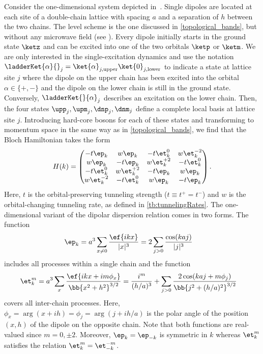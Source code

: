 Consider the one-dimensional system depicted in~.
Single dipoles are located at each site of a double-chain lattice with spacing $a$ and a separation of $h$ between the two chains.
The level scheme is the one discussed in \cref{topological_bands}, but without any microwave field (see ). Every dipole initially starts in the ground state $\ketz$ and can be excited into one of the two orbitals $\ketp$ or $\ketm$.
We are only interested in the single-excitation dynamics and use the notation $\ladderKet{\alpha}{}_j = \ket{\alpha}_{j,\text{upper}} \ket{0}_{j,\text{lower}}$ to indicate a state at lattice site $j$ where the dipole on the upper chain has been excited into the orbital $\alpha \in \{+, -\}$ and the dipole on the lower chain is still in the ground state.
Conversely, $\ladderKet{}{\alpha}_j$ describes an excitation on the lower chain.
Then, the four states $\upp_j, \upm_j, \dnp_j, \dnm_j$ define a complete local basis at lattice site $j$.
Introducing hard-core bosons for each of these states and transforming to momentum space in the same way as in \cref{topological_bands}, we find that the Bloch Hamiltonian takes the form
\begin{align}
    H(k) =
    \begin{pmatrix}
        -t \ep_k  & w \ep_k & -t \et^0_k & w \et^{-2}_k \\
        w \ep_k & -t \ep_k  & w \et^{+2}_k & -t \et^0_k \\
        -t \et^0_{k} & w \et^{+2}_{k}  & -t \ep_k  & w \ep_k \\
        w \et^{-2}_{k} & -t \et^0_{k} & w \ep_k & -t \ep_k
    \end{pmatrix}.
\end{align}
Here, $t$ is the orbital-preserving tunneling strength ($t \equiv t^+ = t^-$) and $w$ is the orbital-changing tunneling rate, as defined in \cref{tb:tunnelingRates}.
The one-dimensional variant of the dipolar dispersion relation comes in two forms. The function
\begin{align}
    \ep_k &= a^3 \sum_{x\ne 0} \frac{\ef{i k x}}{|x|^3} = 2 \sum_{j>0} \frac{\cos(k a j)}{|j|^3}
\end{align}
includes all processes within a single chain and the function
\begin{align}
    \et^m_k &= a^3 \sum_{x} \frac{\ef{i k x + i m \phi_x}}{\bb{x^2 + h^2}^{3/2}}
    = \frac{i^m}{(h/a)^3} + \sum_{j>0} \frac{2\cos(ka j+m\phi_j)}{\bb{j^2+(h/a)^2}^{3/2}}
\end{align}
covers all inter-chain processes. Here, $\phi_x = \arg(x+ i h)=\phi_j=\arg(j+ i h/a)$ is the polar angle of the position $(x, h)$ of the dipole on the opposite chain.
Note that both functions are real-valued since $m = 0, \pm 2$. Moreover, $\ep_k=\ep_{-k}$ is symmetric in $k$ whereas $\et^m_k$ satisfies the relation $\et^m_k=\et^{-m}_{-k}$.

